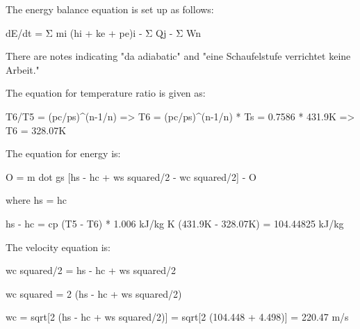 The energy balance equation is set up as follows:

dE/dt = Σ mi (hi + ke + pe)i - Σ Qj - Σ Wn

There are notes indicating "da adiabatic" and "eine Schaufelstufe verrichtet keine Arbeit."

The equation for temperature ratio is given as:

T6/T5 = (pc/ps)^(n-1/n) => T6 = (pc/ps)^(n-1/n) * Ts = 0.7586 * 431.9K => T6 = 328.07K

The equation for energy is:

O = m dot gs [hs - hc + ws squared/2 - wc squared/2] - O

where hs = hc

hs - hc = cp (T5 - T6) * 1.006 kJ/kg K (431.9K - 328.07K) = 104.44825 kJ/kg

The velocity equation is:

wc squared/2 = hs - hc + ws squared/2

wc squared = 2 (hs - hc + ws squared/2)

wc = sqrt[2 (hs - hc + ws squared/2)] = sqrt[2 (104.448 + 4.498)] = 220.47 m/s